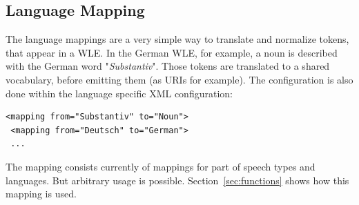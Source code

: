 \subsection{Language Mapping}\label{sec:mapping}
The language mappings are a very simple way to translate and normalize tokens, that appear in a WLE. 
In the German WLE, for example, a noun is described with the German word "\textit{Substantiv}". 
Those tokens are translated to a shared vocabulary, before emitting them (as URIs for example). 
The configuration is also done within the language specific XML configuration:
\begin{lstlisting}[style=XML]
 <mapping from="Substantiv" to="Noun"> 
 <mapping from="Deutsch" to="German"> 
 ...
\end{lstlisting}
The mapping consists currently of mappings for part of speech types and languages. 
But arbitrary usage is possible. 
Section~\ref{sec:functions} shows how this mapping is used.

